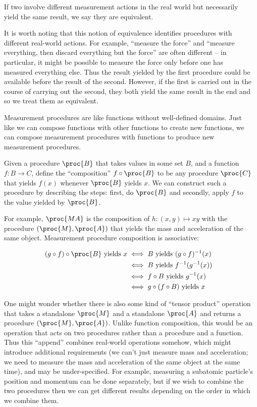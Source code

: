 If two involve different measurement actions in the real world but necessarily yield the same result, we say they are equivalent.

It is worth noting that this notion of equivalence identifies procedures with different real-world actions. For example, ``measure the force'' and ``measure everything, then discard everything but the force'' are often different -- in particular, it might be possible to measure the force only before one has measured everything else. Thus the result yielded by the first procedure could be available before the result of the second. However, if the first is carried out in the course of carrying out the second, they both yield the same result in the end and so we treat them as equivalent. 

Measurement procedures are like functions without well-defined domains. Just like we can compose functions with other functions to create new functions, we can compose measurement procedures with functions to produce new measurement procedures.

\begin{definition}
Given a procedure $\proc{B}$ that takes values in some set $B$, and a function $f:B\to C$, define the ``composition'' $f\circ \proc{B}$ to be any procedure $\proc{C}$ that yields $f(x)$ whenever $\proc{B}$ yields $x$. We can construct such a procedure by describing the steps: first, do $\proc{B}$ and secondly, apply $f$ to the value yielded by $\proc{B}$.
\end{definition}

For example, $\proc{MA}$ is the composition of $h:(x,y)\mapsto xy$ with the procedure $(\proc{M},\proc{A})$ that yields the mass and acceleration of the same object. Measurement procedure composition is associative:

\begin{align}
    (g\circ f)\circ\proc{B}\text{ yields } x &\iff B\text{ yields } (g\circ f)^{-1}(x) \\
    &\iff B\text{ yields } f^{-1}(g^{-1}(x))\\
    &\iff f\circ B \text{ yields } g^{-1}(x)\\
    &\iff g\circ(f\circ B)\text{ yields } x
\end{align}


One might wonder whether there is also some kind of ``tensor product'' operation that takes a standalone $\proc{M}$ and a standalone $\proc{A}$ and returns a procedure $(\proc{M},\proc{A})$. Unlike function composition, this would be an operation that acts on two procedures rather than a procedure and a function. Thus this ``append'' combines real-world operations somehow, which might introduce additional requirements (we can't just measure mass and acceleration; we need to measure the mass and acceleration of the same object at the same time), and may be under-specified. For example, measuring a subatomic particle's position and momentum can be done separately, but if we wish to combine the two procedures then we can get different results depending on the order in which we combine them.

